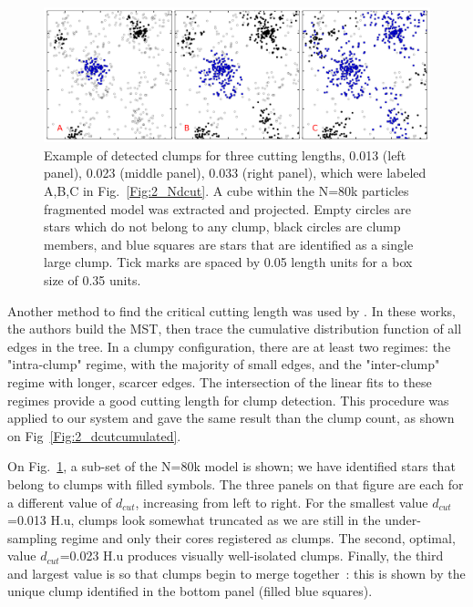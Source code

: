  

 


\begin{figure}
\begin{center}
\includegraphics[width=\columnwidth]{Figures/2_clumpsABC.png}
\end{center}
\caption[Example of detected clumps for three cutting lengths in a N=80k model]{Example of detected clumps for three cutting lengths, 0.013 (left panel), 0.023 (middle panel), 0.033 (right panel), which were labeled A,B,C  in Fig.~\ref{Fig:2_Ndcut}. A cube within the N=80k particles fragmented model was extracted and projected.  Empty circles are stars which do not belong to any clump, black circles are clump members, and blue squares are stars that are identified as a single large  clump. Tick marks are spaced by 0.05 length units for a box size of 0.35 units.}
\label{Fig:2_clumpsABC}
\end{figure} 




Another method to find the critical cutting length was used by \cite{Gutermuth2009,Kirk2011}. In these works, the authors build the MST, then trace the cumulative distribution function of all edges in the tree. In a clumpy configuration, there are at least two regimes: the "intra-clump" regime, with the majority of small edges, and the "inter-clump" regime with longer, scarcer edges. The intersection of the linear fits to these regimes provide a good cutting length for clump detection. This procedure was applied to our system and gave the same result than the clump count, as shown on Fig~\ref{Fig:2_dcutcumulated}.

 
   On Fig.~\ref{Fig:2_clumpsABC}, a sub-set of the N=80k model is shown; we have identified stars that belong to clumps with filled symbols. The three panels on that figure are each for a different value of $d_{cut}$, increasing from left to right. For the smallest value $d_{cut}$=0.013 H.u, clumps look somewhat truncated as we are still in the under-sampling regime and only their cores registered as clumps. The second, optimal, value $d_{cut}$=0.023 H.u produces visually well-isolated clumps. Finally, the third and  largest value is so that clumps begin to merge together~: this is shown by the unique clump identified in the bottom panel (filled blue squares).
   

